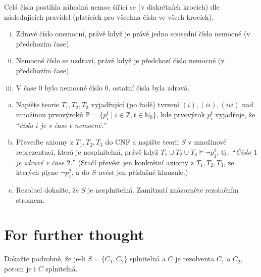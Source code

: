 \begin{problem}

    Celá čísla postihla záhadná nemoc šířící se (v diskrétních krocích) dle následujících pravidel (platících pro všechna čísla ve všech krocích).
    \begin{enumerate}[(i)]\it
        \item Zdravé číslo onemocní, právě když je právě jedno sousední číslo nemocné (v předchozím čase).
        \item Nemocné číslo se uzdraví, právě když je předchozí číslo nemocné (v předchozím čase).
        \item V čase $0$ bylo nemocné číslo $0$, ostatní čísla byla zdravá.
    \end{enumerate}
    \begin{enumerate}[(a)]
        \item Napište teorie $T_1, T_2, T_3$ vyjadřující (po řadě) tvrzení $(i), (ii), (iii)$ nad množinou prvovýroků $\mathbb{P}=\{p_i^t \mid i\in\mathbb{Z}, t\in\mathbb{N}_0\}$, kde prvovýrok $p_i^t$ vyjadřuje, že ``{\it číslo $i$ je v čase $t$ nemocné.}''
        \item Převeďte axiomy z $T_1, T_2, T_3$ do CNF a napište teorii $S$ v množinové reprezentaci, která je nesplnitelná, právě když $T_1 \cup T_2 \cup T_3 \models \neg p_1^2$, tj.: ``{\it Číslo $1$ je zdravé v čase $2$.}'' (Stačí převést jen konkrétní axiomy z $T_1,T_2,T_3$, ze kterých plyne $\neg p_1^2$, a do $S$ uvést jen příslušné klauzule.)
        \item Rezolucí dokažte, že $S$ je nesplnitelná. Zamítnutí znázorněte rezolučním stromem.
    \end{enumerate}

\end{problem}

        
\section*{For further thought}


\begin{problem}
    Dokažte podrobně, že je-li $S=\{C_1,C_2\}$ splnitelná a $C$ je rezolventa $C_1$ a $C_2$, potom je i $C$ splnitelná.
\end{problem}
